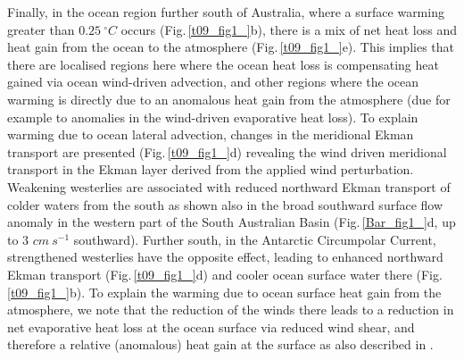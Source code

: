 \documentclass[draft,linenumbers]{agujournal2018}
\begin{document}
Finally, in the ocean region further south of Australia, where a surface warming greater than $0.25\ ^{\circ}C$ occurs (Fig.\,\ref{t09_fig1_}b), there is a mix of net heat loss and heat gain from the ocean to the atmosphere (Fig.\,\ref{t09_fig1_}e). This implies that there are localised regions here where the ocean heat loss is compensating heat gained via ocean wind-driven advection, and other regions where the ocean warming is directly due to an anomalous heat gain from the atmosphere (due for example to anomalies in the wind-driven evaporative heat loss). To explain warming due to ocean lateral advection, changes in the meridional Ekman transport are presented (Fig.\,\ref{t09_fig1_}d) revealing the wind driven meridional transport in the Ekman layer derived from the applied wind perturbation. Weakening westerlies are associated with reduced northward Ekman transport of colder waters from the south \citep{SenGupta2006} as shown also in the broad southward surface flow anomaly in the western part of the South Australian Basin (Fig.\,\ref{Bar_fig1_}d, up to 3 $cm\ s^{-1}$ southward). Further south, in the Antarctic Circumpolar Current, strengthened westerlies have the opposite effect, leading to enhanced northward Ekman transport (Fig.\,\ref{t09_fig1_}d) and cooler ocean surface water there (Fig.\,\ref{t09_fig1_}b). To explain the warming due to ocean surface heat gain from the atmosphere, we note that the reduction of the winds there leads to a reduction in net evaporative heat loss at the ocean surface via reduced wind shear, and therefore a relative (anomalous) heat gain at the surface as also described in \citet{SenGupta2006}. 
\end{document}
